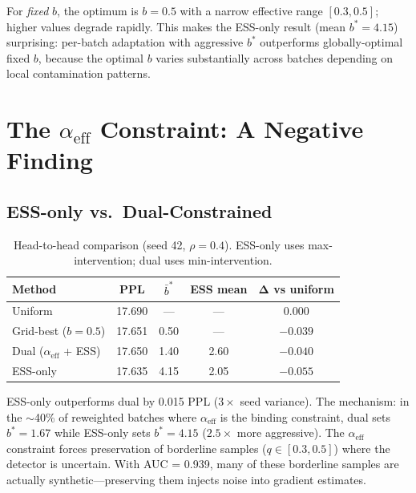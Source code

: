 \documentclass[11pt]{article}
\begin{document}
For \emph{fixed} $b$, the optimum is $b = 0.5$ with a narrow effective range $[0.3, 0.5]$; higher values degrade rapidly. This makes the ESS-only result (mean $b^* = 4.15$) surprising: per-batch adaptation with aggressive $b^*$ outperforms globally-optimal fixed $b$, because the optimal $b$ varies substantially across batches depending on local contamination patterns.

\section{The $\alpha_{\mathrm{eff}}$ Constraint: A Negative Finding}
\label{sec:alpha_negative}

\subsection{ESS-only vs.\ Dual-Constrained}

\begin{table}[h]
\centering
\caption{Head-to-head comparison (seed 42, $\rho = 0.4$). ESS-only uses max-intervention; dual uses min-intervention.}
\label{tab:ess_vs_dual}
\begin{tabular}{lcccc}
\toprule
\textbf{Method} & \textbf{PPL} & $\bar{b}^*$ & \textbf{ESS mean} & $\boldsymbol{\Delta}$ \textbf{vs uniform} \\
\midrule
Uniform & 17.690 & --- & --- & 0.000 \\
Grid-best ($b = 0.5$) & 17.651 & 0.50 & --- & $-0.039$ \\
Dual ($\alpha_{\mathrm{eff}}$ + ESS) & 17.650 & 1.40 & 2.60 & $-0.040$ \\
ESS-only & 17.635 & 4.15 & 2.05 & $-0.055$ \\
\bottomrule
\end{tabular}
\end{table}

ESS-only outperforms dual by 0.015 PPL ($3\times$ seed variance). The mechanism: in the $\sim$40\% of reweighted batches where $\alpha_{\mathrm{eff}}$ is the binding constraint, dual sets $b^* = 1.67$ while ESS-only sets $b^* = 4.15$ ($2.5\times$ more aggressive). The $\alpha_{\mathrm{eff}}$ constraint forces preservation of borderline samples ($q \in [0.3, 0.5]$) where the detector is uncertain. With AUC = 0.939, many of these borderline samples are actually synthetic---preserving them injects noise into gradient estimates.
\end{document}

